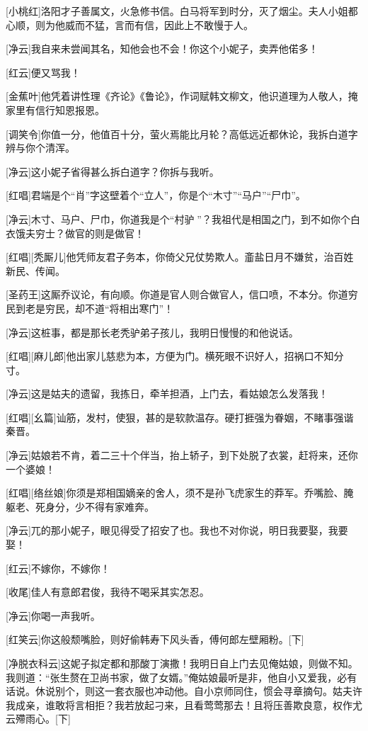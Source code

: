 \documentclass{book}
\begin{document}
[小桃红]洛阳才子善属文，火急修书信。白马将军到时分，灭了烟尘。夫人小姐都心顺，则为他威而不猛，言而有信，因此上不敢慢于人。

[净云]我自来未尝闻其名，知他会也不会！你这个小妮子，卖弄他偌多！

[红云]便又骂我！

[金蕉叶]他凭着讲性理《齐论》《鲁论》，作词赋韩文柳文，他识道理为人敬人，掩家里有信行知恩报恩。

[调笑令]你值一分，他值百十分，萤火焉能比月轮？高低远近都休论，我拆白道字辨与你个清浑。

[净云]这小妮子省得甚么拆白道字？你拆与我听。

[红唱]君端是个``肖''字这壁着个``立人''，你是个``木寸''``马户''``尸巾''。

[净云]木寸、马户、尸巾，你道我是个``村驴𡱃''？我祖代是相国之门，到不如你个白衣饿夫穷士？做官的则是做官！

[红唱][秃厮儿]他凭师友君子务本，你倚父兄仗势欺人。齑盐日月不嫌贫，治百姓新民、传闻。

[圣药王]这厮乔议论，有向顺。你道是官人则合做官人，信口喷，不本分。你道穷民到老是穷民，却不道``将相出寒门''！

[净云]这桩事，都是那长老秃驴弟子孩儿，我明日慢慢的和他说话。

[红唱][麻儿郎]他出家儿慈悲为本，方便为门。横死眼不识好人，招祸口不知分寸。

[净云]这是姑夫的遗留，我拣日，牵羊担酒，上门去，看姑娘怎么发落我！

[红唱][幺篇]讪筋，发村，使狠，甚的是软款温存。硬打捱强为眷姻，不睹事强谐秦晋。

[净云]姑娘若不肯，着二三十个伴当，抬上轿子，到下处脱了衣裳，赶将来，还你一个婆娘！

[红唱][络丝娘]你须是郑相国嫡亲的舍人，须不是孙飞虎家生的莽军。乔嘴脸、腌躯老、死身分，少不得有家难奔。

[净云]兀的那小妮子，眼见得受了招安了也。我也不对你说，明日我要娶，我要娶！

[红云]不嫁你，不嫁你！

[收尾]佳人有意郎君俊，我待不喝采其实怎忍。

[净云]你喝一声我听。

[红笑云]你这般颓嘴脸，则好偷韩寿下风头香，傅何郎左壁厢粉。[下]

[净脱衣科云]这妮子拟定都和那酸丁演撒！我明日自上门去见俺姑娘，则做不知。我则道：``张生赘在卫尚书家，做了女婿。''俺姑娘最听是非，他自小又爱我，必有话说。休说别个，则这一套衣服也冲动他。自小京师同住，惯会寻章摘句。姑夫许我成亲，谁敢将言相拒？我若放起刁来，且看莺莺那去！且将压善欺良意，权作尤云殢雨心。[下]
\end{document}
